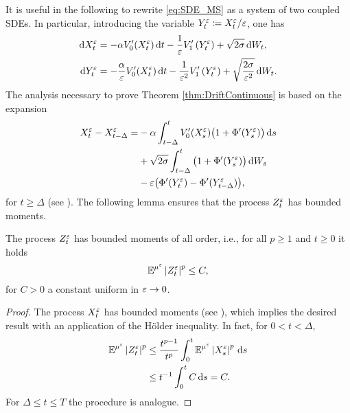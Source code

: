 \documentclass[10pt]{article}
\begin{document}
It is useful in the following to rewrite \eqref{eq:SDE_MS} as a system of two coupled SDEs. In particular, introducing the variable $Y^\varepsilon_t \coloneqq X^\varepsilon_t / \varepsilon$, one has
\begin{equation}\label{eq:SDE_MS2}
\begin{aligned}
	\mathrm{d} X_t^\varepsilon &= -\alpha V_0'(X_t^\varepsilon) \,\mathrm{d} t - \frac1{\varepsilon} V_1'\left(Y_t^\varepsilon\right) + \sqrt{2\sigma} \,\mathrm{d} W_t, \\
	\mathrm{d} Y_t^\varepsilon &= -\frac{\alpha}{\varepsilon} V_0'(X_t^\varepsilon) \,\mathrm{d} t - \frac1{\varepsilon^2} V_1'\left(Y^\varepsilon_t\right) + \sqrt{\frac{2\sigma}{\varepsilon^2}} \,\mathrm{d} W_t.
\end{aligned}
\end{equation}
The analysis necessary to prove Theorem \ref{thm:DriftContinuous} is based on the expansion 
\begin{equation}\label{eq:ContDiffDecomp}
\begin{aligned}
	X^\varepsilon_t - X^\varepsilon_{t-\Delta} = &-\alpha \int_{t-\Delta}^t V_0'(X^\varepsilon_s)\big(1 + \Phi'(Y^\varepsilon_s)\big)\,\mathrm{d} s \\
	&+\sqrt{2\sigma}\int_{t-\Delta}^t \big(1 + \Phi'(Y^\varepsilon_s)\big) \,\mathrm{d} W_s \\
	&-\varepsilon \big(\Phi'(Y^\varepsilon_t)- \Phi'(Y^\varepsilon_{t - \Delta})\big),
\end{aligned}
\end{equation}
for $t \geq \Delta$ (see \cite[Equation (5.8)]{PaS07}). The following lemma ensures that the process $Z^\varepsilon_t$ has bounded moments. 

\begin{lemma}\label{lem:BoundMoments} The process $Z_t^\varepsilon$ has bounded moments of all order, i.e., for all $p \geq 1$ and $t \geq 0$ it holds
	\begin{equation}
		\operatorname{\mathbb{E}}^{\mu^\varepsilon} \left\lvert Z_t^\varepsilon\right\rvert^p \leq C,
	\end{equation}
	for $C > 0$ a constant uniform in $\varepsilon \to 0$.
\end{lemma}
\begin{proof} The process $X^\varepsilon_t$ has bounded moments (see \cite[Corollary 5.4]{PaS07}), which implies the desired result with an application of the Hölder inequality. In fact, for $0 < t < \Delta$,
\begin{equation}
\begin{aligned}
	\operatorname{\mathbb{E}}^{\mu^\varepsilon} \left\lvert Z_t^\varepsilon\right\rvert^p &\leq \frac{t^{p-1}}{t^p} \int_0^t \operatorname{\mathbb{E}}^{\mu^\varepsilon} \left\lvert X_s^\varepsilon\right\rvert^p \,\mathrm{d} s \\
	&\leq t^{-1} \int_0^t C \,\mathrm{d} s = C.
\end{aligned}
\end{equation}
For $\Delta \leq t \leq T$ the procedure is analogue. 
\end{proof}
\end{document}
